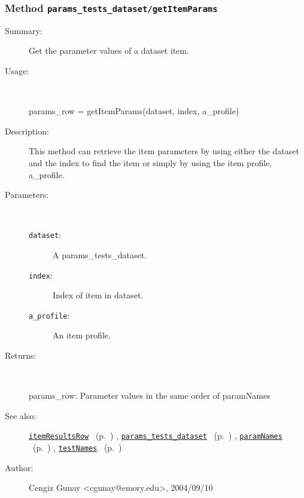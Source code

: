 \subsubsection[Method \texttt{getItemParams}]{Method \texttt{params\_tests\_dataset/getItemParams}}%
%
\label{ref_params_tests_dataset__getItemParams}%
\hypertarget{ref_params_tests_dataset__getItemParams}{}%
\begin{description}
\item[Summary:]Get the parameter values of a dataset item.
%
\item[Usage:]~%
\begin{lyxcode}%
params\_row = getItemParams(dataset, index, a\_profile)
%
\end{lyxcode}%
%
\item[Description:]%
This method can retrieve the item parameters by using either the 
 dataset and the index to find the item or simply by using
 the item profile, a\_profile.
\item[Parameters:]~
\begin{description}%
\item[\texttt{dataset}:]
 A params\_tests\_dataset.
\item[\texttt{index}:]
 Index of item in dataset.
\item[\texttt{a\_profile}:]
 An item profile.
\end{description}%
%
\item[Returns:
]~

	params\_row: Parameter values in the same order of paramNames
%
%
\item[See also:]%
\hyperlink{ref_itemResultsRow}{\texttt{itemResultsRow}}%
\ (p.~\pageref{ref_itemResultsRow})%
%
, \hyperlink{ref_params_tests_dataset}{\texttt{params\_tests\_dataset}}%
\ (p.~\pageref{ref_params_tests_dataset})%
%
, \hyperlink{ref_paramNames}{\texttt{paramNames}}%
\ (p.~\pageref{ref_paramNames})%
%
, \hyperlink{ref_testNames}{\texttt{testNames}}%
\ (p.~\pageref{ref_testNames})%
%
%
\item[Author:]%
Cengiz Gunay <cgunay@emory.edu>, 2004/09/10
%
\end{description}
\methodline%
